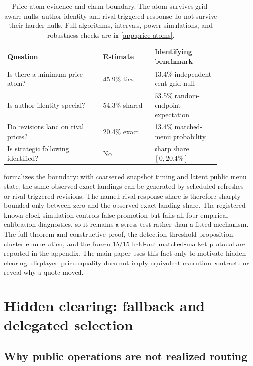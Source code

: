\documentclass[11pt]{article}
\newcommand{\1}{\mathbf{1}}
\begin{document}
\begin{table}[H]
\centering
\small
\begin{tabular}{p{0.39\linewidth}p{0.21\linewidth}p{0.27\linewidth}}
\toprule
Question & Estimate & Identifying benchmark \\
\midrule
Is there a minimum-price atom? & 45.9\% ties & 13.4\% independent cent-grid null \\
Is author identity special? & 54.3\% shared & 53.5\% random-endpoint expectation \\
Do revisions land on rival prices? & 20.4\% exact & 13.4\% matched-menu probability \\
Is strategic following identified? & No & sharp share $[0,20.4\%]$ \\
\bottomrule
\end{tabular}
\caption{Price-atom evidence and claim boundary.  The atom survives grid-aware
nulls; author identity and rival-triggered response do not survive their harder
nulls.  Full algorithms, intervals, power simulations, and robustness checks are
in \cref{app:price-atoms}.}
\label{tab:price-atom-summary}
\end{table}

 formalizes the boundary: with coarsened snapshot
timing and latent public menu state, the same observed exact landings can be
generated by scheduled refreshes or rival-triggered revisions.  The named-rival
response share is therefore sharply bounded only between zero and the observed
exact-landing share.  The registered known-clock simulation controls false
promotion but fails all four empirical calibration diagnostics, so it remains a
stress test rather than a fitted mechanism.  The full theorem and constructive
proof, the detection-threshold proposition, cluster enumeration, and the frozen
15/15 held-out matched-market protocol are reported in the appendix.  The main
paper uses this fact only to motivate hidden clearing: displayed price equality
does not imply equivalent execution contracts or reveal why a quote moved.

\section{Hidden clearing: fallback and delegated selection}
\label{sec:firmness}

\subsection{Why public operations are not realized routing}
\end{document}
